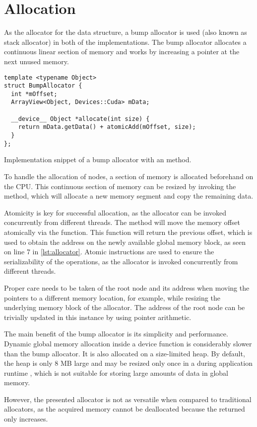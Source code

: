 \section{Allocation}

As the allocator for the data structure, a bump allocator is used (also known as stack allocator) in both of the implementations. The bump allocator allocates a continuous linear section of memory and works by increasing a pointer at the next unused memory.

\begin{listing}
  \begin{verbatim}
template <typename Object>
struct BumpAllocator { 
  int *mOffset;
  ArrayView<Object, Devices::Cuda> mData;

  __device__ Object *allocate(int size) {
    return mData.getData() + atomicAdd(mOffset, size);
  }
};
  \end{verbatim}
  \caption{Implementation snippet of a bump allocator with an  method.}
  \label{lst:allocator}
\end{listing}

To handle the allocation of nodes, a section of memory is allocated beforehand on the CPU. This continuous section of memory can be resized by invoking the  method, which will allocate a new memory segment and copy the remaining data.

Atomicity is key for successful allocation, as the allocator can be invoked concurrently from different threads. The  method will move the memory offset atomically via the  function. This function will return the previous offset, which is used to obtain the address on the newly available global memory block, as seen on line 7 in \cref{lst:allocator}. Atomic instructions are used to ensure the serializability of the operations, as the allocator is invoked concurrently from different threads.

Proper care needs to be taken of the root node and its address when moving the pointers to a different memory location, for example, while resizing the underlying memory block of the allocator. The address of the root node can be trivially updated in this instance by using pointer arithmetic.

The main benefit of the bump allocator is its simplicity and performance. Dynamic global memory allocation inside a device function is considerably slower \cite{vinkler2015register} than the bump allocator. It is also allocated on a size-limited heap. By default, the heap is only 8 MB large and may be resized only once in a during application runtime \cite{cudaprog}, which is not suitable for storing large amounts of data in global memory.

However, the presented allocator is not as versatile when compared to traditional allocators, as the acquired memory cannot be deallocated because the returned  only increases.
